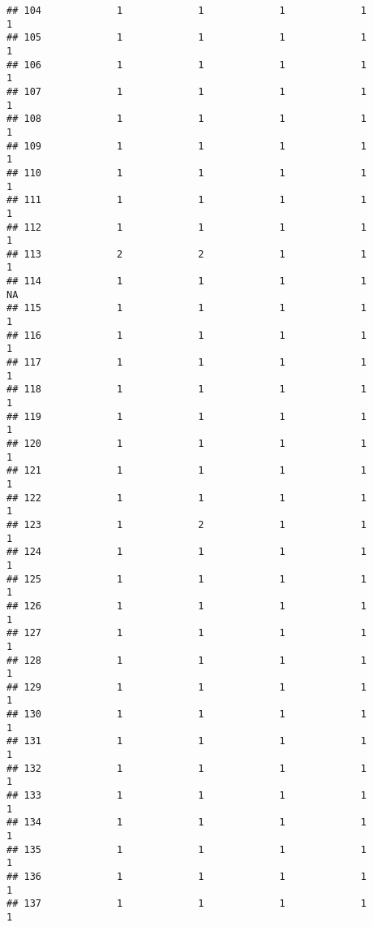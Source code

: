 \documentclass[
]{article}
\begin{document}
\begin{verbatim}
## 104             1             1             1             1             1
## 105             1             1             1             1             1
## 106             1             1             1             1             1
## 107             1             1             1             1             1
## 108             1             1             1             1             1
## 109             1             1             1             1             1
## 110             1             1             1             1             1
## 111             1             1             1             1             1
## 112             1             1             1             1             1
## 113             2             2             1             1             1
## 114             1             1             1             1            NA
## 115             1             1             1             1             1
## 116             1             1             1             1             1
## 117             1             1             1             1             1
## 118             1             1             1             1             1
## 119             1             1             1             1             1
## 120             1             1             1             1             1
## 121             1             1             1             1             1
## 122             1             1             1             1             1
## 123             1             2             1             1             1
## 124             1             1             1             1             1
## 125             1             1             1             1             1
## 126             1             1             1             1             1
## 127             1             1             1             1             1
## 128             1             1             1             1             1
## 129             1             1             1             1             1
## 130             1             1             1             1             1
## 131             1             1             1             1             1
## 132             1             1             1             1             1
## 133             1             1             1             1             1
## 134             1             1             1             1             1
## 135             1             1             1             1             1
## 136             1             1             1             1             1
## 137             1             1             1             1             1

\end{verbatim}
\end{document}
